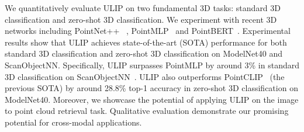 \documentclass[10pt,twocolumn,letterpaper]{article}
\begin{document}
We quantitatively evaluate ULIP on two fundamental 3D tasks: standard 3D classification and zero-shot 3D classification. We experiment with recent 3D networks including PointNet++ ~\cite{qi2017pointnet++}, PointMLP~\cite{ma2022rethinking} and PointBERT~\cite{yu2022point}. 
Experimental results show that ULIP achieves state-of-the-art (SOTA) performance for both standard 3D classification and zero-shot 3D classification on ModelNet40 and ScanObjectNN. Specifically, ULIP surpasses PointMLP by around 3\% in standard 3D classification on ScanObjectNN~\cite{Uy_2019_ICCV}. ULIP also outperforms PointCLIP~\cite{zhang2022pointclip} (the previous SOTA) by around 28.8\% top-1 accuracy in zero-shot 3D classification on ModelNet40. Moreover, we showcase the potential of applying ULIP on the image to point cloud retrieval task. %
Qualitative evaluation demonstrate our promising potential for cross-modal applications.



\end{document}
